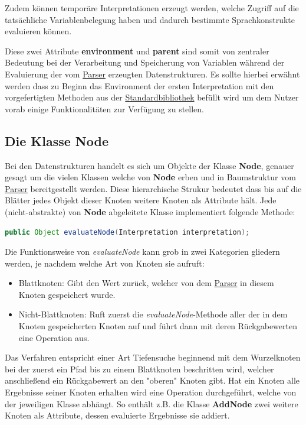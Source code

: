 Zudem können temporäre Interpretationen erzeugt werden, welche Zugriff auf die tatsächliche Variablenbelegung haben und dadurch bestimmte Sprachkonstrukte evaluieren können. 

Diese zwei Attribute \textbf{environment} und \textbf{parent} sind somit von zentraler Bedeutung bei der Verarbeitung und Speicherung von Variablen während der Evaluierung der vom \underline{Parser} erzeugten Datenstrukturen.
Es sollte hierbei erwähnt werden dass zu Beginn das Environment der ersten Interpretation mit den vorgefertigten Methoden aus der \underline{Standardbibliothek} befüllt wird um dem Nutzer vorab einige Funktionalitäten zur Verfügung zu stellen.


\subsection{Die Klasse Node}
\label{Node}
Bei den Datenstrukturen handelt es sich um Objekte der Klasse \textbf{Node}, genauer gesagt um die vielen Klassen welche von \textbf{Node} erben und in Baumstruktur vom \underline{Parser} bereitgestellt werden. Diese hierarchische Strukur bedeutet dass bis auf die Blätter jedes Objekt dieser Knoten weitere Knoten als Attribute hält. Jede (nicht-abstrakte) von \textbf{Node} abgeleitete Klasse implementiert folgende Methode:


\begin{lstlisting}[caption=Funktionsdeklaration der Methode \textit{evaluateNode}, language=Java]
public Object evaluateNode(Interpretation interpretation);
\end{lstlisting}
Die Funktionsweise von \textit{evaluateNode} kann grob in zwei Kategorien gliedern werden, je nachdem welche Art von Knoten sie aufruft:
\begin{itemize}
  \item Blattknoten: Gibt den Wert zurück, welcher von dem \underline{Parser} in diesem Knoten gespeichert wurde.
  \item Nicht-Blattknoten: Ruft zuerst die \textit{evaluateNode}-Methode aller der in dem Knoten gespeicherten Knoten auf und führt dann mit deren Rückgabewerten eine Operation aus.
\end{itemize}
Das Verfahren entspricht einer Art Tiefensuche beginnend mit dem Wurzelknoten bei der zuerst ein Pfad bis zu einem Blattknoten beschritten wird, welcher anschließend ein Rückgabewert an den "oberen" Knoten gibt. Hat ein Knoten alle Ergebnisse seiner Knoten erhalten wird eine Operation durchgeführt, welche von der jeweiligen Klasse abhängt. So enthält z.B. die Klasse \textbf{AddNode} zwei weitere Knoten als Attribute, dessen evaluierte Ergebnisse sie addiert.


